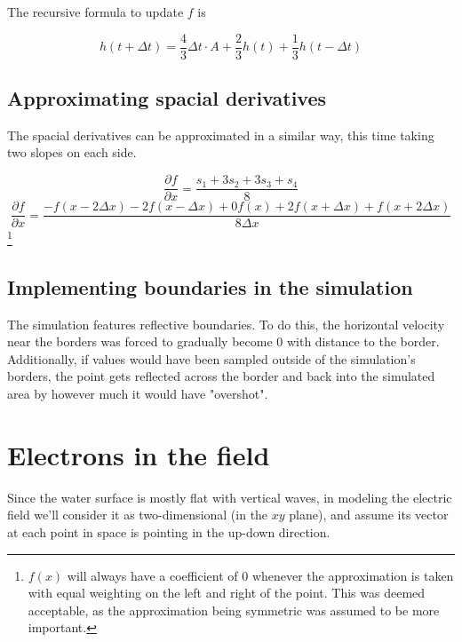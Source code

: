 \documentclass{article}
\begin{document}
The recursive formula to update $f$ is

\begin{equation}
    h(t + \Delta t) = \frac{4}{3} \Delta t \cdot A + \frac{2}{3}h(t) + \frac{1}{3} h(t - \Delta t)
\end{equation}

\subsection{Approximating spacial derivatives}

The spacial derivatives can be approximated in a similar way, this time taking two slopes on each side.

\begin{equation}
    \frac{\partial f}{\partial x} = \frac{s_1 + 3s_2 + 3s_3 + s_4}{8}
\end{equation}
\begin{equation}
    \frac{\partial f}{\partial x} = \frac{-f(x-2\Delta x) - 2f(x-\Delta x) + 0f(x) + 2f(x + \Delta x) + f(x + 2\Delta x)}{8\Delta x}
\end{equation}\footnote{$f(x)$ will always have a coefficient of 0 whenever the approximation is taken with equal weighting on the left and right of the point. This was deemed acceptable, as the approximation being symmetric was assumed to be more important.}

\subsection{Implementing boundaries in the simulation}

The simulation features reflective boundaries. To do this, the horizontal velocity near the borders was forced to gradually become 0 with distance to the border. Additionally, if values would have been sampled outside of the simulation's borders, the point gets reflected across the border and back into the simulated area by however much it would have "overshot".

\section{Electrons in the field}

Since the water surface is mostly flat with vertical waves, in modeling the electric field we'll consider it as two-dimensional (in the $xy$ plane), and assume its vector at each point in space is pointing in the up-down direction.
\end{document}
